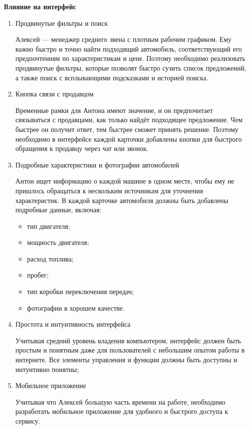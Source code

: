 \textbf{Влияние на интерфейс}
\bigskip

\begin{enumerate}
    \item Продвинутые фильтры и поиск

        Алексей — менеджер среднего звена с плотным рабочим графиком. Ему важно быстро и точно найти подходящий автомобиль, соответствующий его предпочтениям по характеристикам и цене. Поэтому необходимо реализовать продвинутые фильтры, которые позволят быстро сузить список предложений, а также поиск с всплывающими подсказками и историей поиска.

    \item Кнопка связи с продавцом

        Временные рамки для Антона имеют значение, и он предпочитает связываться с продавцами, как только найдёт подходящее предложение. Чем быстрее он получит ответ, тем быстрее сможет принять решение. Поэтому необходимо в интерфейсе каждой карточки добавлены кнопки для быстрого обращения к продавцу через чат или звонок.

    \item Подробные характеристики и фотографии автомобилей

        Антон ищет информацию о каждой машине в одном месте, чтобы ему не пришлось обращаться к нескольким источникам для уточнения характеристик. В каждой карточке автомобиля должны быть добавлены подробные данные, включая:

    \begin{itemize}
        \item тип двигателя;
        \item мощность двигателя;
        \item расход топлива;
        \item пробег;
        \item тип коробки переключения передач;
        \item фотографии в хорошем качестве.
    \end{itemize}

    \item Простота и интуитивность интерфейса

        Учитывая средний уровень владения компьютером, интерфейс должен быть простым и понятным даже для пользователей с небольшим опытом работы в интернете. Все элементы управления и функции должны быть доступны и интуитивно понятны;

    \item Мобильное приложение

        Учитывая что Алексей большую часть времени на работе, необходимо разработать мобильное приложение для удобного и быстрого доступа к сервису.
\end{enumerate}

